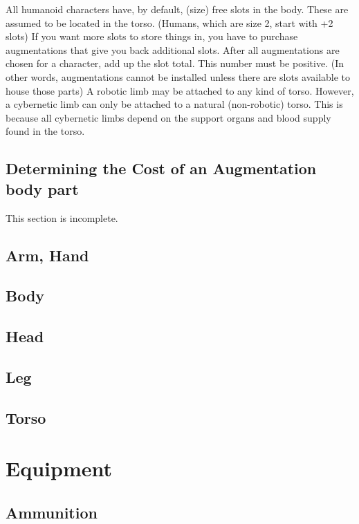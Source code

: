 \documentclass[twoside]{book}
\begin{document}
                All humanoid characters have, by default, (size)
               free slots in the body. These are assumed to be located in
               the torso. (Humans, which are size 2, start with +2 slots)
               If you want more slots to store things in, you have to
               purchase augmentations that give you back additional
               slots. 
                After all augmentations are chosen for a character,
               add up the slot total. This number must be positive. (In
               other words, augmentations cannot be installed unless
               there are slots available to house those parts) 
                A robotic limb may be attached to any kind of
               torso. However, a cybernetic limb can only be attached to
               a natural (non-robotic) torso. This is because all
               cybernetic limbs depend on the support organs and blood
               supply found in the torso. 
          
\section{Determining the Cost of an Augmentation body part}
     This section is incomplete. 
\section{Arm, Hand}
    
\section{Body}
    
\section{Head}
    
\section{Leg}
    
\section{Torso}
    
\chapter{Equipment}
    
\section{Ammunition}
    
\end{document}
